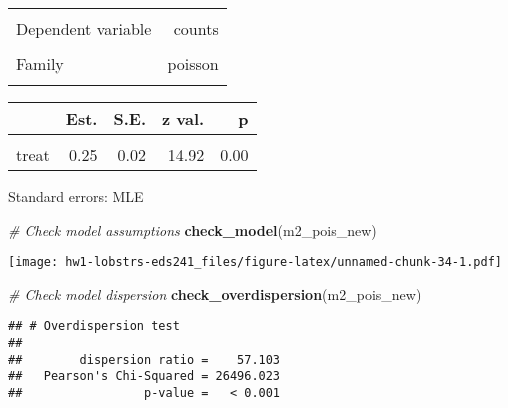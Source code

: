 \documentclass[
]{article}
\newenvironment{Shaded}{\begin{snugshade}}{\end{snugshade}}
\newcommand{\CommentTok}[1]{\textcolor[rgb]{0.56,0.35,0.01}{\textit{#1}}}
\newcommand{\FunctionTok}[1]{\textcolor[rgb]{0.13,0.29,0.53}{\textbf{#1}}}
\newcommand{\NormalTok}[1]{#1}
\begin{document}
\begin{table}[!h]
\centering
\begin{tabular}{lr}
\toprule
\cellcolor{gray!10}{Observations} & \cellcolor{gray!10}{466}\\
Dependent variable & counts\\
\cellcolor{gray!10}{Type} & \cellcolor{gray!10}{Generalized linear model}\\
Family & poisson\\
\cellcolor{gray!10}{Link} & \cellcolor{gray!10}{log}\\
\bottomrule
\end{tabular}
\end{table}  \begin{table}[!h]
\centering
\begin{threeparttable}
\begin{tabular}{lrrrr}
\toprule
  & Est. & S.E. & z val. & p\\
\midrule
\cellcolor{gray!10}{(Intercept)} & \cellcolor{gray!10}{3.31} & \cellcolor{gray!10}{0.01} & \cellcolor{gray!10}{270.75} & \cellcolor{gray!10}{0.00}\\
treat & 0.25 & 0.02 & 14.92 & 0.00\\
\bottomrule
\end{tabular}
\begin{tablenotes}
\item Standard errors: MLE
\end{tablenotes}
\end{threeparttable}
\end{table}

\begin{Shaded}
\begin{Highlighting}[]
\CommentTok{\# Check model assumptions}
\FunctionTok{check\_model}\NormalTok{(m2\_pois\_new)}
\end{Highlighting}
\end{Shaded}

\texttt{[image: hw1-lobstrs-eds241\_files/figure-latex/unnamed-chunk-34-1.pdf]}

\begin{Shaded}
\begin{Highlighting}[]
\CommentTok{\# Check model dispersion}
\FunctionTok{check\_overdispersion}\NormalTok{(m2\_pois\_new)}
\end{Highlighting}
\end{Shaded}

\begin{verbatim}
## # Overdispersion test
## 
##        dispersion ratio =    57.103
##   Pearson's Chi-Squared = 26496.023
##                 p-value =   < 0.001
\end{verbatim}
\end{document}
